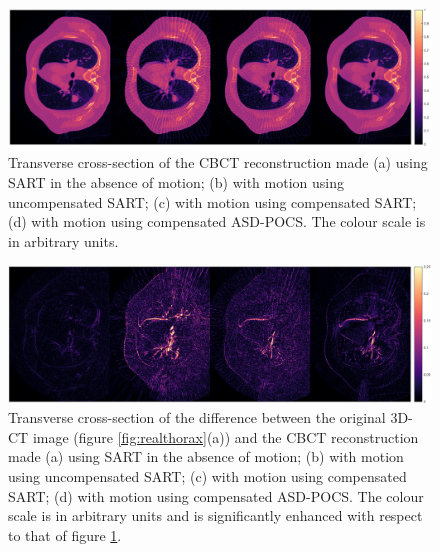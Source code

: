 \begin{figure}[H]
\begin{center} 

\includegraphics[width=1\linewidth]{MotionCorrection/res3.png} 
\hspace{0.1cm}{\footnotesize (a)}\hspace{3.2cm}{\footnotesize (b)}\hspace{3.2cm}{\footnotesize (c)}\hspace{3.2cm}{\footnotesize (d)}

\caption{\label{fig:res3}  Transverse cross-section of the CBCT reconstruction made (a) using SART in the absence of motion; (b) with motion using uncompensated SART; (c) with motion using compensated SART; (d) with motion using compensated ASD-POCS.  The colour scale is in arbitrary units.} 
\end{center} 
\end{figure}

\begin{figure}[H]
\begin{center} 
\includegraphics[width=1\linewidth]{MotionCorrection/res3err.png} 
\hspace{0.1cm}{\footnotesize (a)}\hspace{3.2cm}{\footnotesize (b)}\hspace{3.2cm}{\footnotesize (c)}\hspace{3.2cm}{\footnotesize (d)}
\caption{\label{fig:res3err}  Transverse cross-section of the difference  between the original 3D-CT image (figure \ref{fig:realthorax}(a)) and the CBCT reconstruction made (a) using SART in the absence of motion; (b) with motion using uncompensated SART; (c) with motion using compensated SART; (d) with motion using compensated ASD-POCS.  The colour scale is in arbitrary units and is significantly enhanced with respect to that of figure \ref{fig:res3}.} 
\end{center} 
\end{figure}

